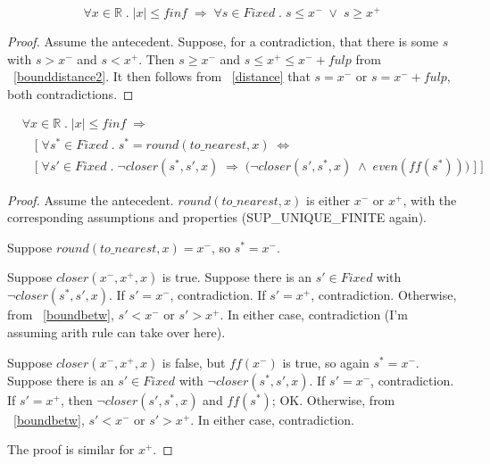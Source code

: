 \documentclass{article}
\begin{document}
\begin{lem}
\label{boundbetw}
\begin{equation*}
\forall x \in \mathbb{R} \; . \; |x| \leq finf \;
\Longrightarrow \; 
\forall s \in Fixed \; . \; s \leq x^- \; \vee \; s \geq x^+
\end{equation*}
\begin{proof} Assume the antecedent. Suppose, for a contradiction, that
there is some $s$ with $s > x^-$ and $s < x^+$. Then $s \geq x^-$ and
$s \leq x^+ \leq x^- + fulp$ from ~\ref{bounddistance2}. It then follows
from ~\ref{distance} that $s = x^-$ or $s = x^- + fulp$, both contradictions.
\end{proof}
\end{lem}

\begin{thm}
\label{rndnear}
\begin{align*}
&\forall x \in \mathbb{R} \; . \; |x| \leq finf \;
\Longrightarrow \\
& \quad \Big [ \; \forall s^* \in Fixed \; . \; s^* = round(to\_nearest,x) \; 
\Longleftrightarrow \\
& \quad \Big [ \; \forall s' \in Fixed \; . \; 
\neg closer(s^*, s', x) \; 
\Longrightarrow
\; \big(\neg closer(s', s^*, x) \; \wedge \; even(ff(s^*)) \big) \; \Big ]
\; \Big ]
\end{align*}
\begin{proof} Assume the antecedent. $round(to\_nearest,x)$ is either
$x^-$ or $x^+$, with the corresponding assumptions and properties
(SUP\_UNIQUE\_FINITE again).

Suppose $round(to\_nearest, x) = x^-$, so $s^* = x^-$. 

Suppose $closer(x^-, x^+,x)$ is true. Suppose there is an $s' \in Fixed$
with $\neg closer(s^*, s', x)$. If $s' = x^-$, contradiction. If
$s' = x^+$, contradiction. Otherwise, from ~\ref{boundbetw}, $s' < x^-$
or $s' > x^+$. In either case, contradiction (I'm assuming arith rule
can take over here).

Suppose $closer(x^-, x^+,x)$ is false, but $ff(x^-)$ is true, so
again $s^* = x^-$. Suppose there is an $s' \in Fixed$
with $\neg closer(s^*, s', x)$. If $s' = x^-$, contradiction. If
$s' = x^+$, then $\neg closer(s', s^*, x)$ and $ff(s^*)$; OK. Otherwise, 
from ~\ref{boundbetw}, $s' < x^-$ or $s' > x^+$. In either case, contradiction.

The proof is similar for $x^+$.
\end{proof}
\end{thm}
\end{document}
